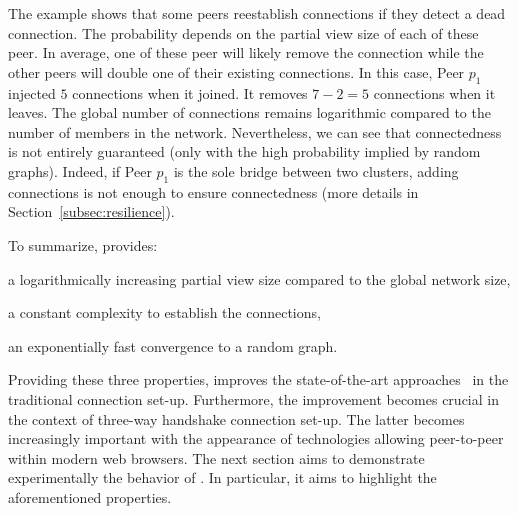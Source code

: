 The example shows that some peers reestablish connections if they
detect a dead connection. The probability depends on the partial view
size of each of these peer. In average, one of these peer will likely
remove the connection while the other peers will double one of their
existing connections. In this case, Peer $p_1$ injected $5$
connections when it joined. It removes $7-2 =5 $ connections when it
leaves. The global number of connections remains logarithmic compared
to the number of members in the network. Nevertheless, we can see that
connectedness is not entirely guaranteed (only with the high
probability implied by random graphs). Indeed, if Peer $p_1$ is the
sole bridge between two clusters, adding connections is not enough to
ensure connectedness (more details in
Section~\ref{subsec:resilience}).


To summarize, \SPRAY{} provides:
\begin{inparaenum}[(i)]
\item a logarithmically increasing partial view size compared to the global
  network size,
\item a constant complexity to establish the connections,
\item an exponentially fast convergence to a random graph.
\end{inparaenum}
Providing these three properties, \SPRAY{} improves the state-of-the-art
approaches~\cite{ganesh2001scamp,voulgaris2005cyclon} in the traditional
connection set-up. Furthermore, the improvement becomes crucial in the context
of three-way handshake connection set-up.  The latter becomes increasingly
important with the appearance of technologies allowing peer-to-peer within
modern web browsers.  The next section aims to demonstrate experimentally the
behavior of \SPRAY{}. In particular, it aims to highlight the aforementioned
properties.


